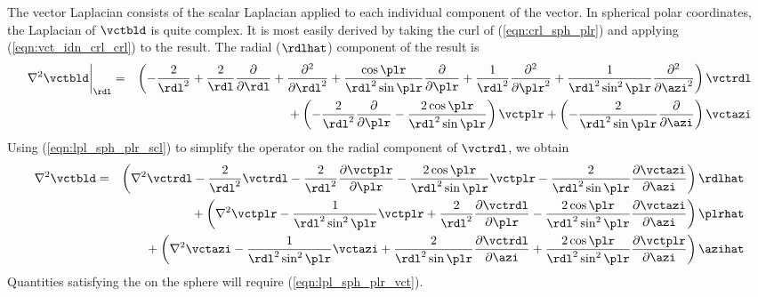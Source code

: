 \documentclass[12pt,twoside]{book}
\begin{document}
The vector Laplacian consists of the scalar Laplacian applied to each 
individual component of the vector.
In spherical polar coordinates, the Laplacian of $\vctbld$ is quite
complex.
It is most easily derived by taking the curl of (\ref{eqn:crl_sph_plr})
and applying (\ref{eqn:vct_idn_crl_crl}) to the result. %
The radial ($\rdlhat$) component of the result is 
\begin{eqnarray}
\nabla^{2} \vctbld \bigg|_{\rdl} & = & \left(
-\frac{2}{\rdl^{2}} + \frac{2}{\rdl} \frac{\partial}{\partial \rdl} +
\frac{\partial^{2}}{\partial \rdl^{2}} + 
\frac{\cos \plr}{\rdl^{2} \sin \plr} \frac{\partial}{\partial \plr} +
\frac{1}{\rdl^{2}} \frac{\partial^{2}}{\partial \plr^{2}} +
\frac{1}{\rdl^{2} \sin^{2} \plr} \frac{\partial^{2}}{\partial \azi^{2}}
\right) \vctrdl  
\nonumber \\ & & {} + %
\left( -\frac{2}{\rdl^{2}} \frac{\partial}{\partial \plr} -
\frac{2 \cos \plr}{\rdl^{2} \sin \plr} \right) \vctplr +
\left( - \frac{2}{\rdl^{2} \sin \plr} \frac{\partial}{\partial \azi} 
\right) \vctazi
\label{eqn:lpl_sph_plr_vct_rdl}
\end{eqnarray}
Using (\ref{eqn:lpl_sph_plr_scl}) to simplify the operator on the
radial component of $\vctrdl$, we obtain
\begin{eqnarray}
\nabla^{2} \vctbld & = & 
\left( \nabla^{2} \vctrdl - \frac{2}{\rdl^{2}} \vctrdl -
\frac{2}{\rdl^{2}} \frac{\partial \vctplr}{\partial \plr} -
\frac{2 \cos \plr}{\rdl^{2} \sin \plr} \vctplr -
\frac{2}{\rdl^{2} \sin \plr} \frac{\partial \vctazi}{\partial \azi}
\right) \rdlhat
\nonumber \\ & & {} + %
\left( \nabla^{2} \vctplr - \frac{1}{\rdl^{2} \sin^{2} \plr} \vctplr +
\frac{2}{\rdl^{2}} \frac{\partial \vctrdl}{\partial \plr} - 
\frac{2 \cos \plr}{\rdl^{2} \sin^{2} \plr} 
\frac{\partial \vctazi}{\partial \azi}
\right) \plrhat
\nonumber \\ & & {} + %
\left( \nabla^{2} \vctazi - \frac{1}{\rdl^{2} \sin^{2} \plr} \vctazi +
\frac{2}{\rdl^{2} \sin \plr} \frac{\partial \vctrdl}{\partial \azi} +
\frac{2 \cos \plr}{\rdl^{2} \sin^{2} \plr} 
\frac{\partial \vctplr}{\partial \azi} 
\right) \azihat
\label{eqn:lpl_sph_plr_vct}
\end{eqnarray}
Quantities satisfying the  on the sphere
will require (\ref{eqn:lpl_sph_plr_vct}).
\end{document}
